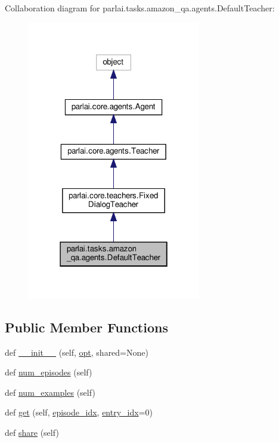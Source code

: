Collaboration diagram for parlai.\+tasks.\+amazon\+\_\+qa.\+agents.\+Default\+Teacher\+:
\nopagebreak
\begin{figure}[H]
\begin{center}
\leavevmode
\includegraphics[width=214pt]{dc/dc0/classparlai_1_1tasks_1_1amazon__qa_1_1agents_1_1DefaultTeacher__coll__graph}
\end{center}
\end{figure}
\subsection*{Public Member Functions}
\begin{DoxyCompactItemize}
\item 
def \hyperlink{classparlai_1_1tasks_1_1amazon__qa_1_1agents_1_1DefaultTeacher_a6fd5b4e1c7ac8e4572c46873b6f0b9b4}{\+\_\+\+\_\+init\+\_\+\+\_\+} (self, \hyperlink{classparlai_1_1core_1_1agents_1_1Teacher_a3ce6243860ce978a897922863ed32fa4}{opt}, shared=None)
\item 
def \hyperlink{classparlai_1_1tasks_1_1amazon__qa_1_1agents_1_1DefaultTeacher_a3a1a2ff47ab734ec74022502502b7f79}{num\+\_\+episodes} (self)
\item 
def \hyperlink{classparlai_1_1tasks_1_1amazon__qa_1_1agents_1_1DefaultTeacher_a7500d021a66a77b200b43d910afcb6e4}{num\+\_\+examples} (self)
\item 
def \hyperlink{classparlai_1_1tasks_1_1amazon__qa_1_1agents_1_1DefaultTeacher_ab7d01dd226a50cf520bd7de7a523f3e0}{get} (self, \hyperlink{classparlai_1_1core_1_1teachers_1_1FixedDialogTeacher_afd4ebab8063eb42d182d30a1a41f133e}{episode\+\_\+idx}, \hyperlink{classparlai_1_1core_1_1teachers_1_1FixedDialogTeacher_ae3201b15f3c3b46a2f3511bad9b43e7d}{entry\+\_\+idx}=0)
\item 
def \hyperlink{classparlai_1_1tasks_1_1amazon__qa_1_1agents_1_1DefaultTeacher_ada0d98ee271a27425e64ce82b9700aa4}{share} (self)
\end{DoxyCompactItemize}
